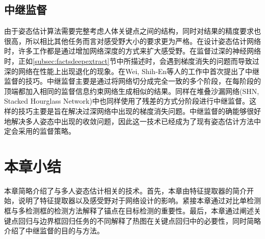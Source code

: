 \subsection{中继监督}
\label{subsec:factsintersupervision}
由于姿态估计算法需要完整考虑人体关键点之间的结构，同时对结果的精度要求也很高，所以相比其他任务而言对感受野大小的要求更为严格。在设计姿态估计网络时，许多工作都是通过增加网络深度的方式来扩大感受野。在监督过深的神经网络时，正如\ref{subsec:factsdeepextract}节中所描述时，会遇到梯度消失的问题而导致过深的网络在性能上出现退化的现象。在Wei, Shih-En等人的工作中\cite{wei2016convolutional}首次提出了中继监督的技巧。中继监督主要是通过将网络切分成完全一致的多个阶段，在每阶段的顶端都加入相同的监督信息约束网络生成相似的结果。同样在堆叠沙漏网络(SHN, Stacked Hourglass Network)\cite{newell2016stacked}中也同样使用了残差的方式分阶段进行中继监督。这样的技巧主要是旨在解决过深网络中出现的梯度消失问题。中继监督的确能够很好地解决多人姿态中出现的收敛问题，因此这一技术已经成为了现有姿态估计方法中定会采用的监督策略。

\section{本章小结}
本章简略介绍了与多人姿态估计相关的技术。首先，本章由特征提取器的简介开始，说明了特征提取器以及感受野对于网络设计的影响。紧接本章通过对比单检测框与多检测框的检测方法解释了锚点在目标检测的重要性。最后，本章通过阐述关键点回归与边界框回归任务的不同解释了热图在关键点回归中的必要性，同时简略介绍了中继监督的目的与方法。
